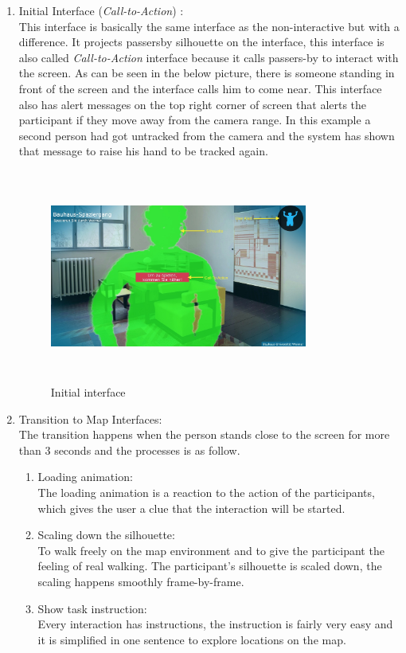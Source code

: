 \begin{enumerate}

\item Initial Interface (\emph{Call-to-Action}) : \\
This interface is basically the same interface as the non-interactive but with a difference. It projects passersby silhouette on the interface, this interface is also called \emph{Call-to-Action} interface because it calls passers-by to interact with the screen. As can be seen in the below picture, there is someone standing in front of the screen and the interface calls him to come near. This interface also has alert messages on the top right corner of screen that alerts the participant if they move away from the camera range. In this example a second person had got untracked from the camera and the system has shown that message to raise his hand to be tracked again.

\begin{figure}[H]
    \centering
    \includegraphics[width=0.8\textwidth,height=70mm]{Figures/7/body_interactive/first_interface}
    \caption{Initial interface}%
    \label{fig:body_firstinterface}%
\end{figure}


\item Transition to Map Interfaces: \\
The transition happens when the person stands close to the screen for more than 3 seconds and the processes is as follow.

\begin{enumerate}
\item Loading animation:\\
 The loading animation is a reaction to the action of the participants, which gives the user a clue that the interaction will be started. 
\item Scaling down the silhouette: \\
To walk freely on the map environment and to give the participant the feeling of real walking. The participant's silhouette is scaled down, the scaling happens smoothly frame-by-frame.
\item Show task instruction:  \\
Every interaction has instructions, the instruction is fairly very easy and it is simplified in one sentence to explore locations on the map.
\end{enumerate}


\end{enumerate}
